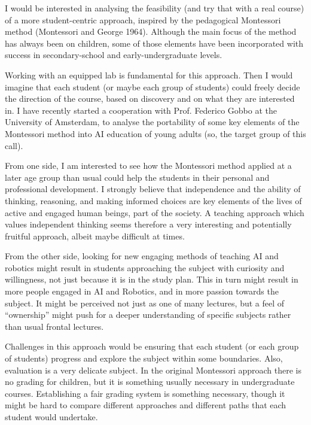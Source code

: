\documentclass[letterpaper]{article}
\begin{document}
I would be interested in analysing the feasibility (and try that with a real course) of a more student-centric approach, inspired by the pedagogical Montessori method (Montessori and George 1964). Although the main focus of the method has always been on children, some of those elements have been incorporated with success in secondary-school and early-undergraduate levels.

Working with an equipped lab is fundamental for this approach. Then I would imagine that each student (or maybe each group of students) could freely decide the direction of the course, based on discovery and on what they are interested in. I have recently started a cooperation with Prof. Federico Gobbo at the University of Amsterdam, to analyse the portability of some key elements of the Montessori method into AI education of young adults (so, the target group of this call).

From one side, I am interested to see how the Montessori method applied at a later age group than usual could help the students in their personal and professional development. I strongly believe that independence and the ability of thinking, reasoning, and making informed choices are key elements of the lives of active and engaged human beings, part of the society. A teaching approach which values independent thinking seems therefore a very interesting and potentially fruitful approach, albeit maybe difficult at times.

From the other side, looking for new engaging methods of teaching AI and robotics might result in students approaching the subject with curiosity and willingness, not just because it is in the study plan. This in turn might result in more people engaged in AI and Robotics, and in more passion towards the subject. It might be perceived not just as one of many lectures, but a feel of ``ownership'' might push for a deeper understanding of specific subjects rather than usual frontal lectures.

Challenges in this approach would be ensuring that each student (or each group of students) progress and explore the subject within some boundaries. Also, evaluation is a very delicate subject. In the original Montessori approach there is no grading for children, but it is something usually necessary in undergraduate courses. Establishing a fair grading system is something necessary, though it might be hard to compare different approaches and different paths that each student would undertake.\\[-0.75em]
\end{document}
